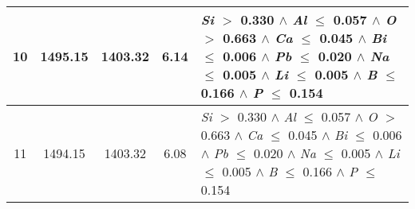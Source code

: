 \begin{table}[!htbp]
\begin{tabular}{ccccm{}}
		\hline
		10 & 1495.15 & 1403.32 & 6.14 & \textit{Si} $>$ 0.330 $\wedge$ \textit{Al} $\le$ 0.057 $\wedge$ \textit{O} $>$ 0.663 $\wedge$ \textit{Ca} $\le$ 0.045 $\wedge$ \textit{Bi} $\le$ 0.006 $\wedge$ \textit{Pb} $\le$ 0.020 $\wedge$ \textit{Na} $\le$ 0.005 $\wedge$ \textit{Li} $\le$ 0.005 $\wedge$ \textit{B} $\le$ 0.166 $\wedge$ \textit{P} $\le$ 0.154\\
		\hline
		11 & 1494.15 & 1403.32 & 6.08 & \textit{Si} $>$ 0.330 $\wedge$ \textit{Al} $\le$ 0.057 $\wedge$ \textit{O} $>$ 0.663 $\wedge$ \textit{Ca} $\le$ 0.045 $\wedge$ \textit{Bi} $\le$ 0.006 $\wedge$ \textit{Pb} $\le$ 0.020 $\wedge$ \textit{Na} $\le$ 0.005 $\wedge$ \textit{Li} $\le$ 0.005 $\wedge$ \textit{B} $\le$ 0.166 $\wedge$ \textit{P} $\le$ 0.154\\
		\bottomrule
	\end{tabular}
\end{table}
